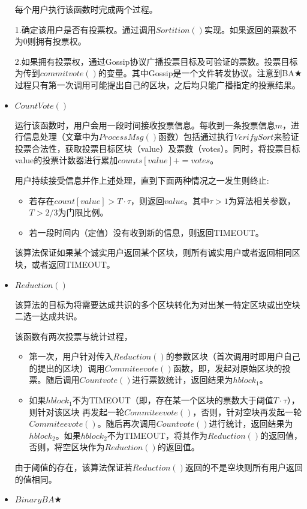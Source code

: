 \begin{itemize}
	每个用户执行该函数时完成两个过程。
	
	1.确定该用户是否有投票权。通过调用$Sortition()$实现。如果返回的票数不为0则拥有投票权。
	
	2.如果拥有投票权，通过Gossip协议广播投票目标及可验证的票数。投票目标为传到$commitvote()$的变量。其中Gossip是一个文件转发协议。注意到BA$\bigstar$过程只有第一次调用可能提出自己的区块，之后均只能广播指定的投票结果。
	
	\item $CountVote()$
	
	运行该函数时，用户会用一段时间接收投票信息。每收到一条投票信息$m$，进行信息处理（文章中为$ProcessMsg()$函数）包括通过执行$VerifySort$来验证投票合法性，获取投票目标区块（value）及票数（votes）。同时，将投票目标value的投票计数器进行累加$counts[value]+=votes$。
	
	用户持续接受信息并作上述处理，直到下面两种情况之一发生则终止:
	\begin{itemize}
		\item 若存在$count[value]>T\cdot \tau$，则返回$value$。其中$\tau>1$为算法相关参数，$T>2/3$为门限比例。
		\item 若一段时间内（定值）没有收到新的信息，则返回TIMEOUT。
	\end{itemize}
	该算法保证如果某个诚实用户返回某个区块，则所有诚实用户或者返回相同区块，或者返回TIMEOUT。
    \item $Reduction()$
    
    该算法的目标为将需要达成共识的多个区块转化为对出某一特定区块或出空块二选一达成共识。
    
    该函数有两次投票与统计过程，
    \begin{itemize}   
    \item  第一次，用户针对传入$Reduction()$的参数区块（首次调用时即用户自己的提出的区块）调用$Commiteevote()$函数，即，发起对原始区块的投票。随后调用$Countvote()$进行票数统计，返回结果为$hblock_1$。
    
    \item 如果$hblock_1$不为TIMEOUT（即，存在某一个区块的票数大于阈值$T\cdot\tau$），则针对该区块
      再发起一轮$Commiteevote()$，否则，针对空块再发起一轮$Commiteevote()$。随后再次调用$Countvote()$进行统计，返回结果为$hblock_2$。如果$hblock_2$不为TIMEOUT，将其作为$Reduction()$的返回值，否则，将空区块作为$Reduction()$的返回值。
     \end{itemize}
     由于阈值的存在，该算法保证若$Reduction()$返回的不是空块则所有用户返回的值相同。
     
     \item $BinaryBA\bigstar$
     

\end{itemize}
